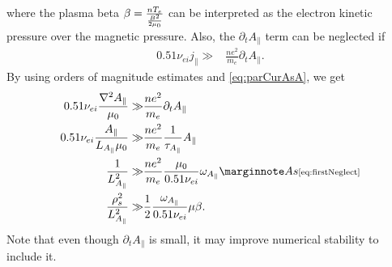 %
where the plasma beta $\beta=\frac{nT_e}{\frac{B^2}{2\mu_0}}$ can be interpreted as the electron kinetic pressure over the magnetic pressure.
Also, the $\partial_t A_\|$ term can be neglected if
%
\begin{align*}
    0.51\nu_{ei}j_\|
    \gg &
    \frac{ne^2}{m_e}\partial_t A_\|.
\end{align*}
%
By using orders of magnitude estimates and \cref{eq:parCurAsA}, we get
%
\begin{align*}
    0.51\nu_{ei}\frac{\grad^2 A_\|}{\mu_0}
    \gg &
    \frac{ne^2}{m_e}\partial_t A_\|
    \\
    0.51\nu_{ei}\frac{A_\|}{L_{A_\|}\mu_0}
    \gg &
    \frac{ne^2}{m_e}\frac{1}{\tau_{A_{\|}}} A_\|
    \\
    \frac{1}{L^2_{A_\|}}
    \gg &
    \frac{ne^2}{m_e}\frac{\mu_0}{0.51\nu_{ei}}\om_{A_{\|}}
    \note{As \cref{eq:firstNeglect}}
    \\
    \frac{\rho_s^2}{L^2_{A_\|}}
    \gg &
    \frac{1}{2}\frac{\om_{A_{\|}}}{0.51\nu_{ei}}\mu
    \b.
\end{align*}
%
Note that even though $\partial_t A_\|$ is small, it may improve numerical stability to include it.
